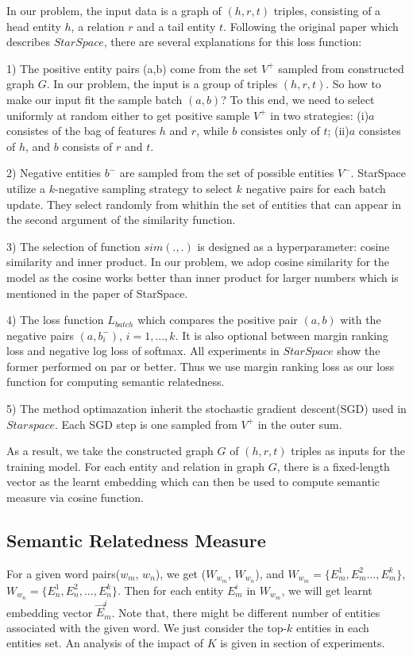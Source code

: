 In our problem, the input data is a graph of $(h, r, t)$ triples, consisting of a head entity $h$, 
a relation $r$ and a tail entity $t$.
Following the original paper which describes $StarSpace$, there are several explanations for this loss function:

1) The positive entity pairs (a,b) come from the set $V^+$ sampled from constructed graph $G$. 
In our problem, the input is a group of triples $(h, r, t)$. So how to make our input fit
the sample batch $(a, b)$? To this end, we need to select uniformly at random either to
get positive sample $V^+$ in two strategies:
(i)$a$ consistes of the bag of features $h$ and $r$, while $b$ consistes only of $t$; 
(ii)$a$ consistes of $h$, and $b$ consists of $r$ and $t$. 

2) Negative entities $b^-$ are sampled from the set of possible entities $V^-$.  
StarSpace utilize a $k$-negative sampling strategy\cite{corr/Mikolov13} to select $k$ negative pairs for each batch update. 
They select randomly from whithin the set of entities that can appear in the second argument of the similarity function.

3) The selection of function $sim(.,.)$ is designed as a hyperparameter: cosine similarity and inner product.
In our problem, we adop cosine similarity for the model as the cosine works better than inner product for
larger numbers which is mentioned in the paper of StarSpace.

4) The loss function $L_{batch}$ which compares the positive pair $(a,b)$ with the negative pairs $(a, b_i^-)$, $i=1,...,k$.
It is also optional between margin ranking loss and negative log loss of softmax. All experiments in $StarSpace$ show
the former performed on par or better. Thus we use margin ranking loss as our loss function for computing semantic relatedness.

5) The method optimazation inherit the stochastic gradient descent(SGD) used in $Starspace$. Each SGD step is one
sampled from $V^+$ in the outer sum.

As a result, we take the constructed graph $G$ of $(h, r, t)$ triples as inputs for the training model.
For each entity and relation in graph $G$, there is a fixed-length vector as the learnt embedding which
can then be used to compute semantic measure via cosine function.



\subsection{Semantic Relatedness Measure}
\label{sec:measure}
For a given word pairs($w_m$, $w_n$), we get ($W_{w_m}$, $W_{w_n}$), and $W_{w_m}=\{E_m^1,E_m^2...,E_m^k\}$,
$W_{w_n}=\{E_n^1,E_n^2,...,E_n^k\}$. Then for each entity $E_m^i$ in $W_{w_m}$, we will get learnt embedding vector
$\overrightarrow E_m^i$.
Note that, there might be different number of entities associated with the given
word. We just consider the top-$k$ entities in each entities set. An analysis of the impact of $K$ is
given in section of experiments.


